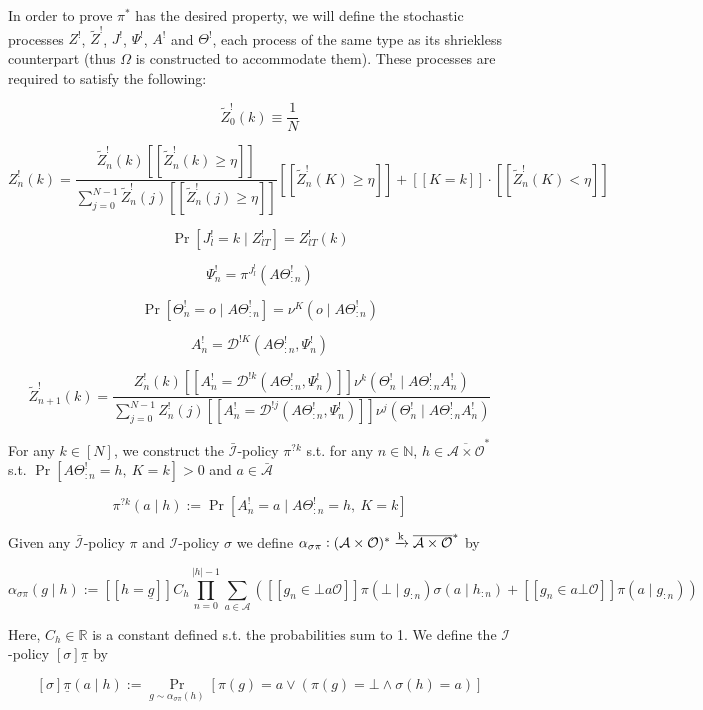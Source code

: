 \documentclass[a4paper]{article}
\newcommand{\AP}[1]{\left(#1\right)}
\newcommand{\Nats}{\mathbb{N}}
\newcommand{\Reals}{\mathbb{R}}
\newcommand{\Abs}[1]{\left\vert #1 \right\vert}
\newcommand{\M}{\xrightarrow{\textnormal{k}}}
\newcommand{\Ob}{\mathcal{O}}
\newcommand{\A}{\mathcal{A}}
\newcommand{\In}{\mathcal{I}}
\newcommand{\FH}{(\A \times \Ob)^*}
\newcommand{\Ada}{\bar{\A}}
\newcommand{\Adi}{{\bar{\In}}}
\newcommand{\Adao}{\overline{\A \times \Ob}}
\newcommand{\Adfh}{\Adao^*}
\newcommand{\Dl}{\mathcal{D}}
\newcommand{\Z}{Z}
\newcommand{\J}{J}
\begin{document}
In order to prove $\pi^*$ has the desired property, we will define the stochastic processes $\Z^!$, $\tilde{\Z}^!$, $\J^!$, $\Psi^!$, $A^!$ and $\Theta^!$, each process of the same type as its shriekless counterpart (thus $\Omega$ is constructed to accommodate them). These processes are required to satisfy the following:

$$\tilde{\Z}^!_0(k)\equiv\frac{1}{N}$$

$$\Z_{n}^!(k) = \frac{\tilde{\Z}^!_{n}(k)[[\tilde{\Z}^!_{n}(k) \geq \eta]] }{\sum_{j = 0}^{N-1}\tilde{\Z}^!_{n}(j)[[\tilde{\Z}^!_{n}(j) \geq \eta]]}[[\tilde{\Z}^!_{n}(K) \geq \eta]] + [[K = k]]\cdot [[\tilde{\Z}^!_{n}(K) < \eta]]$$

$$\Pr\left[\J^!_{l} = k \mid Z^!_{lT}\right] = \Z^!_{lT}\left(k\right)$$

$$\Psi^!_{n} = \pi^{\J^!_l}\AP{A\Theta^!_{:n}}$$

$$\Pr\left[\Theta^!_{n} = o \mid A\Theta^!_{:n}\right] = \nu^K\left(o \mid A\Theta^!_{:n}\right)$$

$$A^!_n = \Dl^{!K}\left(A\Theta^!_{:n}, \Psi^!_n\right)$$

$$\tilde{\Z}^!_{n+1}(k)=\frac{\Z^!_{n}(k) [[A^!_n = \Dl^{!k}\left(A\Theta^!_{:n}, \Psi^!_n\right)]] \nu^k\left(\Theta^!_{n} \mid A\Theta^!_{:n}A^!_{n}\right)}{\sum_{j = 0}^{N-1} \Z^!_n(j) [[A^!_n = \Dl^{!j}\left(A\Theta^!_{:n}, \Psi^!_n\right)]] \nu^j(\Theta^!_n \mid A\Theta^!_{:n}A^!_n)}$$

For any $k \in [N]$, we construct the $\Adi$-policy $\pi^{?k}$ s.t. for any $n \in \Nats$, $h \in \Adfh$ s.t. $\Pr\left[A\Theta^!_{:n}=h,\ K = k\right] > 0$ and $a \in \Ada$

$$\pi^{?k}(a \mid h):=\Pr\left[A^!_n = a \mid A\Theta^!_{:n} = h,\ K = k\right]$$

Given any $\Adi$-policy $\pi$ and $\In$-policy $\sigma$ we define $\alpha_{\sigma\pi}: \FH \M \Adfh$ by

$$\alpha_{\sigma\pi} (g \mid h) := [[h = \underline{g}]]C_h\prod_{n = 0}^{\Abs{h}-1} \sum_{a \in \A}\left([[g_n \in \bot a\Ob]] \pi\left(\bot \mid g_{:n}\right)\sigma\left(a \mid h_{:n}\right)+[[g_n \in a\bot\Ob]]\pi\left(a \mid g_{:n}\right)\right)$$

Here, $C_h \in \Reals$ is a constant defined s.t. the probabilities sum to 1. We define the $\In$-policy $\left[\sigma\right]\underline{\pi}$ by

$$\left[\sigma\right]\underline{\pi}(a \mid h):=\Pr_{g \sim \alpha_{\sigma\pi}(h)}\left[\pi\left(g\right)=a \lor \left(\pi\left(g\right)=\bot \land \sigma(h)=a\right)\right]$$
\end{document}
